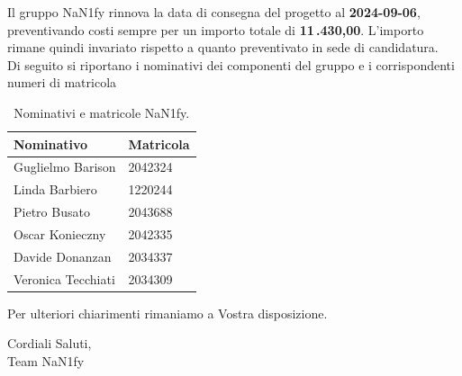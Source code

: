 \documentclass[8pt]{article}
\begin{document}
\begin{center}
	\textbf{\href{https://github.com/NaN1fy/SyncCity}{\color{myblue}{https://github.com/NaN1fy/SyncCity}}}
\end{center}
Il gruppo NaN1fy rinnova la data di consegna del progetto al \textbf{2024-09-06}, preventivando
costi sempre per un importo totale di \textbf{11\,.430,00\;\texteuro}. L’importo rimane quindi invariato
rispetto a quanto preventivato in sede di candidatura.
\vspace{1em}
\\Di seguito si riportano i nominativi dei componenti del gruppo e i corrispondenti numeri di matricola\\
\begin{table}[ht!]
	\centering
	\begin{tabular}{p{3cm} p{3cm}}
		\toprule
		\textbf{Nominativo} & \textbf{Matricola} \\
		\midrule
		Guglielmo Barison & 2042324 \\
		Linda Barbiero &  1220244 \\
		Pietro Busato & 2043688 \\
		Oscar Konieczny & 2042335 \\
		Davide Donanzan & 2034337 \\
		Veronica Tecchiati & 2034309 \\
		\bottomrule
	\end{tabular}
	\caption{Nominativi e matricole NaN1fy.}
	\label{table:Nominativi e matricole NaN1fy}
\end{table}
Per ulteriori chiarimenti rimaniamo a Vostra disposizione.
\vspace{1em}
\begin{flushleft}
	Cordiali Saluti,\\
	Team NaN1fy
\end{flushleft}
\clearpage
\newpage
\justifying
\end{document}
